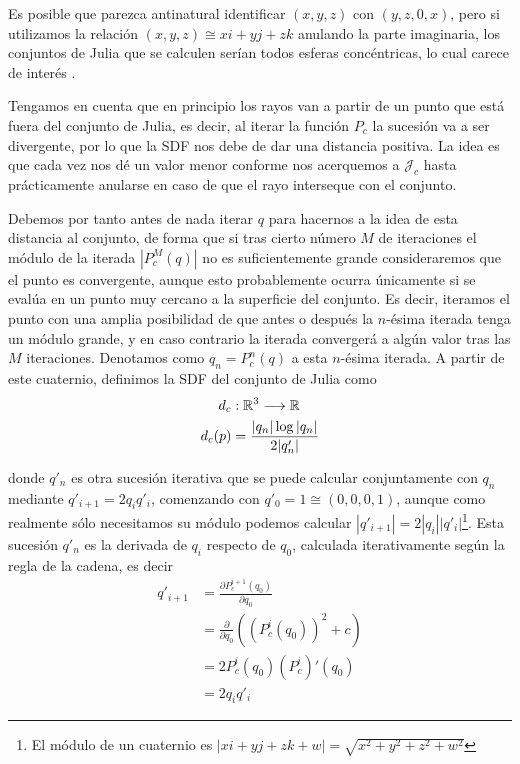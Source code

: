 Es posible que parezca antinatural identificar $(x,y,z)$ con $(y,z,0,x)$, pero si utilizamos la relación $(x,y,z)\cong xi+yj+zk$ anulando la parte imaginaria, los conjuntos de Julia que se calculen serían todos esferas concéntricas, lo cual carece de interés \cite{Hart-1989}.

Tengamos en cuenta que en principio los rayos van a partir de un punto que está fuera del conjunto de Julia, es decir, al iterar la función $P_c$ la sucesión va a ser divergente, por lo que la SDF nos debe de dar una distancia positiva. La idea es que cada vez nos dé un valor menor conforme nos acerquemos a $\mathcal{J}_c$ hasta prácticamente anularse en caso de que el rayo interseque con el conjunto. 

Debemos por tanto antes de nada iterar $q$ para hacernos a la idea de esta distancia al conjunto, de forma que si tras cierto número $M$ de iteraciones el módulo de la iterada $|P_c^M(q)|$ no es suficientemente grande consideraremos que el punto es convergente, aunque esto probablemente ocurra únicamente si se evalúa en un punto muy cercano a la superficie del conjunto. Es decir, iteramos el punto con una amplia posibilidad de que antes o después la $n$-ésima iterada tenga un módulo grande, y en caso contrario la iterada convergerá a algún valor tras las $M$ iteraciones. Denotamos como $q_n=P_c^n(q)$ a esta $n$-ésima iterada. A partir de este cuaternio, definimos la SDF del conjunto de Julia como 
\begin{equation}
    \label{eq:SDF-Julia}
    \begin{split}
        d_c&:\mathbb{R}^3\longrightarrow\mathbb{R} \\
        d_c(p) &= \dfrac{|q_n|\log|q_n|}{2|q'_n|}
    \end{split}
\end{equation}

donde $q'_n$ es otra sucesión iterativa que se puede calcular conjuntamente con $q_n$ mediante $q'_{i+1}=2q_i q'_i$, comenzando con $q'_0=1\cong(0,0,0,1)$, aunque como realmente sólo necesitamos su módulo podemos calcular $|q'_{i+1}|=2|q_i||q'_i|$\footnote{El módulo de un cuaternio es $|xi+yj+zk+w|=\sqrt{x^2+y^2+z^2+w^2}$}. Esta sucesión $q'_n$ es la derivada de $q_i$ respecto de $q_0$, calculada iterativamente según la regla de la cadena, es decir
\begin{equation}
    \begin{split}
        q'_{i+1}&=\frac{\partial P^{i+1}_c(q_0)}{\partial q_0}\\
        &= \frac{\partial}{\partial q_0}\left((P_c^i(q_0))^2+c\right)\\
        &= 2 P_c^i(q_0)(P_c^i)'(q_0)\\
        &= 2 q_i q'_i
    \end{split}
\end{equation}

